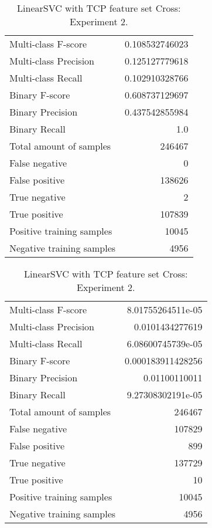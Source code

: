 \begin{table}[H]
\begin{minipage}{0.5\textwidth}
\caption{LinearSVC with TCP feature set Cross: Experiment 1.}
\centering
\begin{tabular}{l r}
\toprule
Multi-class F-score & 0.108532746023 \\
Multi-class Precision & 0.125127779618 \\
Multi-class Recall & 0.102910328766 \\
\midrule
Binary F-score & 0.608737129697 \\
Binary Precision & 0.437542855984 \\
Binary Recall & 1.0 \\
\midrule
Total amount of samples & 246467 \\
False negative & 0 \\
False positive & 138626 \\
True negative & 2 \\
True positive & 107839 \\
\midrule
Positive training samples & 10045 \\
Negative training samples & 4956 \\
\bottomrule
\end{tabular}
\end{minipage}
\hfillx
\begin{minipage}{0.5\textwidth}
\caption{LinearSVC with TCP feature set Cross: Experiment 2.}
\centering
\begin{tabular}{l r}
\toprule
Multi-class F-score & 8.01755264511e-05 \\
Multi-class Precision & 0.0101434277619 \\
Multi-class Recall & 6.08600745739e-05 \\
\midrule
Binary F-score & 0.000183911428256 \\
Binary Precision & 0.01100110011 \\
Binary Recall & 9.27308302191e-05 \\
\midrule
Total amount of samples & 246467 \\
False negative & 107829 \\
False positive & 899 \\
True negative & 137729 \\
True positive & 10 \\
\midrule
Positive training samples & 10045 \\
Negative training samples & 4956 \\
\bottomrule
\end{tabular}
\end{minipage}
\end{table}
